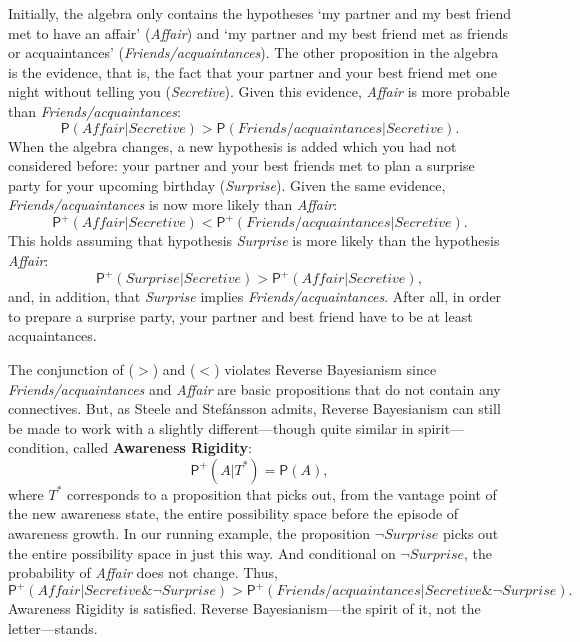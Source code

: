 \documentclass[
  11pt,
  dvipsnames,enabledeprecatedfontcommands]{scrartcl}
\newcommand{\pr}[1]{\ensuremath{\mathsf{P}(#1)}}
\newcommand{\ppr}[2]{\ensuremath{\mathsf{P}^{#1}(#2)}}
\begin{document}
\noindent Initially, the algebra only contains the hypotheses `my
partner and my best friend met to have an affair' (\textit{Affair}) and
`my partner and my best friend met as friends or acquaintances'
(\textit{Friends/acquaintances}). The other proposition in the algebra
is the evidence, that is, the fact that your partner and your best
friend met one night without telling you (\textit{Secretive}). Given
this evidence, \textit{Affair} is more probable than
\textit{Friends/acquaintances}:
\[\pr{\textit{Affair} \vert  \textit{Secretive} }> \pr{\textit{Friends/acquaintances} \vert \textit{Secretive}} \tag{>}.\]
When the algebra changes, a new hypothesis is added which you had not
considered before: your partner and your best friends met to plan a
surprise party for your upcoming birthday (\textit{Surprise}). Given the
same evidence, \textit{Friends/acquaintances} is now more likely than
\textit{Affair}:
\[\ppr{+}{\textit{Affair} \vert  \textit{Secretive} } < \ppr{+}{\textit{Friends/acquaintances} \vert \textit{Secretive}}. \tag{<}\]
This holds assuming that hypothesis \textit{Surprise} is more likely
than the hypothesis \textit{Affair}:
\[\ppr{+}{ \textit{Surprise} \vert \textit{Secretive}}> \ppr{+}{ \textit{Affair} \vert \textit{Secretive}},\]
and, in addition, that \textit{Surprise} implies
\textit{Friends/acquaintances}. After all, in order to prepare a
surprise party, your partner and best friend have to be at least
acquaintances.

The conjunction of (\(>\)) and (\(<\)) violates Reverse Bayesianism
since \textit{Friends/acquaintances} and \textit{Affair} are basic
propositions that do not contain any connectives. But, as Steele and
Stefánsson admits, Reverse Bayesianism can still be made to work with a
slightly different---though quite similar in spirit---condition, called
\textbf{Awareness Rigidity}: \[\ppr{+}{A \vert T^*}=\pr{A},\] where
\(T^*\) corresponds to a proposition that picks out, from the vantage
point of the new awareness state, the entire possibility space before
the episode of awareness growth. In our running example, the proposition
\(\neg\textit{Surprise}\) picks out the entire possibility space in just
this way. And conditional on \(\neg\textit{Surprise}\), the probability
of \textit{Affair} does not change. Thus,
\[\ppr{+}{\textit{Affair} \vert  \textit{Secretive} \& \neg\textit{Surprise} } > \ppr{+}{\textit{Friends/acquaintances} \vert \textit{Secretive} \& \neg\textit{Surprise}}. \]
Awareness Rigidity is satisfied. Reverse Bayesianism---the spirit of it,
not the letter---stands.
\end{document}

